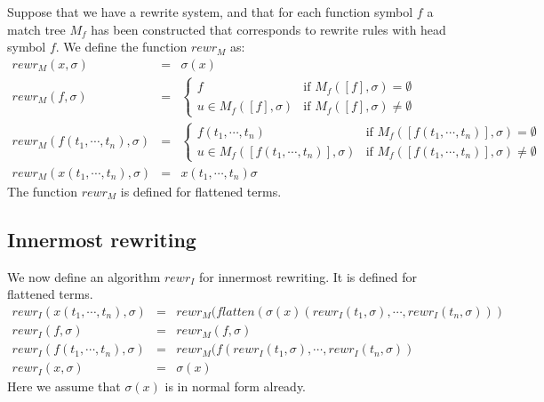 \documentclass{article}
\begin{document}
Suppose that we have a rewrite system, and that for each function symbol $f$
a match tree $M_{f}$ has been constructed that corresponds to rewrite rules
with head symbol $f$. We define the function $rewr_{M}$ as:%
\begin{equation*}
\begin{array}{lll}
rewr_{M}(x,\sigma ) & = & \sigma (x) \\ 
rewr_{M}(f,\sigma ) & = & \left\{ 
\begin{array}{ll}
f & \text{if }M_{f}([f],\sigma )=\emptyset  \\ 
u\in M_{f}([f],\sigma ) & \text{if }M_{f}([f],\sigma )\neq \emptyset 
\end{array}%
\right.  \\ 
rewr_{M}(f(t_{1},\cdots ,t_{n}),\sigma ) & = & \left\{ 
\begin{array}{ll}
f(t_{1},\cdots ,t_{n}) & \text{if }M_{f}([f(t_{1},\cdots ,t_{n})],\sigma
)=\emptyset  \\ 
u\in M_{f}([f(t_{1},\cdots ,t_{n})],\sigma ) & \text{if }M_{f}([f(t_{1},%
\cdots ,t_{n})],\sigma )\neq \emptyset 
\end{array}%
\right.  \\ 
rewr_{M}(x(t_{1},\cdots ,t_{n}),\sigma ) & = & x(t_{1},\cdots ,t_{n})\sigma 
\end{array}%
\end{equation*}%
The function $rewr_{M}$ is defined for flattened terms.

\subsection{Innermost rewriting}

We now define an algorithm $rewr_{I}$ for innermost rewriting. It is defined
for flattened terms.%
\begin{equation*}
\begin{array}{lll}
rewr_{I}(x(t_{1},\cdots ,t_{n}),\sigma ) & = & rewr_{M}(flatten(\sigma
(x)(rewr_{I}(t_{1},\sigma ),\cdots ,rewr_{I}(t_{n},\sigma ))) \\ 
rewr_{I}(f,\sigma ) & = & rewr_{M}(f,\sigma ) \\ 
rewr_{I}(f(t_{1},\cdots ,t_{n}),\sigma ) & = & rewr_{M}(f(rewr_{I}(t_{1},%
\sigma ),\cdots ,rewr_{I}(t_{n},\sigma )) \\ 
rewr_{I}(x,\sigma ) & = & \sigma (x)%
\end{array}%
\end{equation*}%
Here we assume that $\sigma (x)$ is in normal form already.
\end{document}
